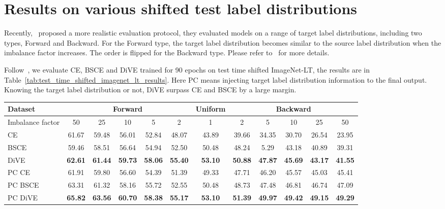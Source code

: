 \documentclass[10pt,twocolumn,letterpaper]{article}
\begin{document}
\section{Results on various shifted test label distributions}

Recently,~\cite{hong2020disentangling} proposed a more realistic evaluation protocol, they evaluated models on a range of target label distributions, including two types, Forward and Backward. For the Forward type, the target label distribution becomes similar to the source label distribution when the imbalance factor increases. The order is flipped for the Backward type. Please refer to~\cite{hong2020disentangling} for more details.

Follow~\cite{hong2020disentangling}, we evaluate CE, BSCE and DiVE trained for 90 epochs on test time shifted ImageNet-LT, the results are in Table~\ref{tab:test_time_shifted_imagenet_lt_results}. Here PC means injecting target label distribution information to the final output. Knowing the target label distribution or not, DiVE surpass CE and BSCE by a large margin.

\begin{table*}
    \caption{Top-1 accuracy over all classes on test time shifted ImageNet-LT. All models are trained for 90 epochs.}
    \centering
       \begin{tabular}{l|ccccc|c|ccccc}
       \hline
       Dataset & \multicolumn{5}{c|}{Forward} & Uniform & \multicolumn{5}{c}{Backward} \\
       \hline
       Imbalance factor & 50 & 25 & 10 & 5 & 2 & 1 & 2 & 5 & 10 & 25 & 50 \\
       \hline \hline
       CE & 61.67 & 59.48 & 56.01 & 52.84 & 48.07 & 43.89 & 39.66 & 34.35 & 30.70 & 26.54 & 23.95\\
       BSCE & 59.46 & 58.51 & 56.64 & 54.94 & 52.50 & 50.48 & 48.24 & 5.29 & 43.18 & 40.89 & 39.31\\
       DiVE & \textbf{62.61} & \textbf{61.44} & \textbf{59.73} & \textbf{58.06} & \textbf{55.40} & \textbf{53.10} & \textbf{50.88} & \textbf{47.87} & \textbf{45.69} & \textbf{43.17} & \textbf{41.55}\\
       \hline
       PC CE & 61.91 & 59.80 & 56.60 & 54.39 & 51.39 & 49.33 & 47.71 & 46.20 & 45.57 & 45.03 & 45.41\\
       PC BSCE & 63.31 & 61.32 & 58.16 & 55.72 & 52.55 & 50.48 & 48.73 & 47.48 & 46.81 & 46.74 & 47.09 \\
       PC DiVE & \textbf{65.82} & \textbf{63.56} & \textbf{60.70} & \textbf{58.38} & \textbf{55.17} & \textbf{53.10} & \textbf{51.39} & \textbf{49.97} & \textbf{49.42} & \textbf{49.15} & \textbf{49.29}\\
       \hline
       \end{tabular}
    \label{tab:test_time_shifted_imagenet_lt_results}
 \end{table*}
\end{document}
